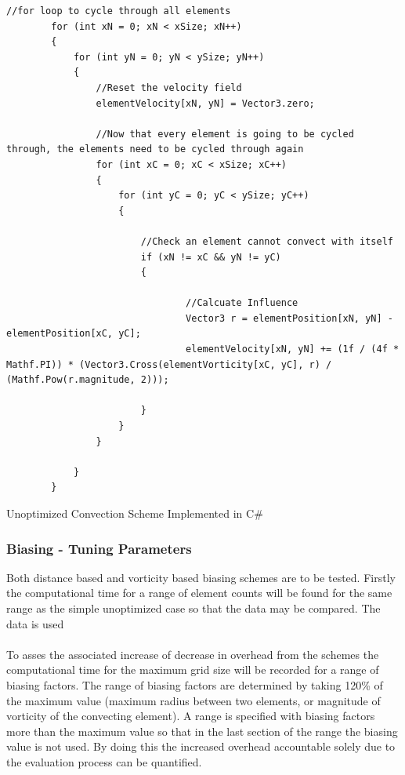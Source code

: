 \begin{listing}[H]
\begin{verbatim}
//for loop to cycle through all elements
        for (int xN = 0; xN < xSize; xN++)
        {
            for (int yN = 0; yN < ySize; yN++)
            {
                //Reset the velocity field
                elementVelocity[xN, yN] = Vector3.zero;

                //Now that every element is going to be cycled through, the elements need to be cycled through again
                for (int xC = 0; xC < xSize; xC++)
                {
                    for (int yC = 0; yC < ySize; yC++)
                    {

                        //Check an element cannot convect with itself
                        if (xN != xC && yN != yC)
                        {

                                //Calcuate Influence
                                Vector3 r = elementPosition[xN, yN] - elementPosition[xC, yC];
                                elementVelocity[xN, yN] += (1f / (4f * Mathf.PI)) * (Vector3.Cross(elementVorticity[xC, yC], r) / (Mathf.Pow(r.magnitude, 2)));
                            
                        }
                    }
                }

            }
        }
\end{verbatim}
\caption{Unoptimized Convection Scheme Implemented in C\#}
\label{list:SimpleConvection}
\end{listing}

\subsubsection{Biasing - Tuning Parameters}
Both distance based and vorticity based biasing schemes are to be tested. Firstly the computational time for a range of element counts will be found for the same range as the simple unoptimized case so that the data may be compared. The data is used
\\\\
To asses the associated increase of decrease in overhead from the schemes the computational time for the maximum grid size will be recorded for a range of biasing factors. The range of biasing factors are determined by taking 120\% of the maximum value (maximum radius between two elements, or magnitude of vorticity of the convecting element). A range is specified with biasing factors more than the maximum value so that in the last section of the range the biasing value  is not used. By doing this the increased overhead accountable solely due to the evaluation process can be quantified.

